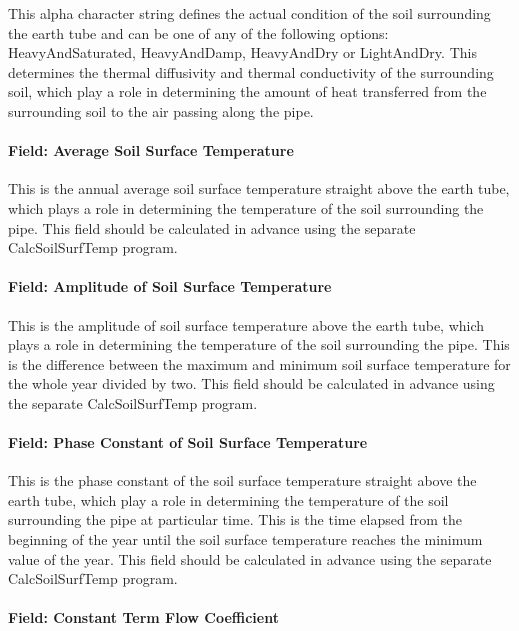 This alpha character string defines the actual condition of the soil surrounding the earth tube and can be one of any of the following options: HeavyAndSaturated, HeavyAndDamp, HeavyAndDry or LightAndDry. This determines the thermal diffusivity and thermal conductivity of the surrounding soil, which play a role in determining the amount of heat transferred from the surrounding soil to the air passing along the pipe.

\paragraph{Field: Average Soil Surface Temperature}\label{field-average-soil-surface-temperature}

This is the annual average soil surface temperature straight above the earth tube, which plays a role in determining the temperature of the soil surrounding the pipe. This field should be calculated in advance using the separate CalcSoilSurfTemp program.

\paragraph{Field: Amplitude of Soil Surface Temperature}\label{field-amplitude-of-soil-surface-temperature}

This is the amplitude of soil surface temperature above the earth tube, which plays a role in determining the temperature of the soil surrounding the pipe. This is the difference between the maximum and minimum soil surface temperature for the whole year divided by two. This field should be calculated in advance using the separate CalcSoilSurfTemp program.

\paragraph{Field: Phase Constant of Soil Surface Temperature}\label{field-phase-constant-of-soil-surface-temperature}

This is the phase constant of the soil surface temperature straight above the earth tube, which play a role in determining the temperature of the soil surrounding the pipe at particular time. This is the time elapsed from the beginning of the year until the soil surface temperature reaches the minimum value of the year. This field should be calculated in advance using the separate CalcSoilSurfTemp program.

\paragraph{Field: Constant Term Flow Coefficient}\label{field-constant-term-flow-coefficient}

